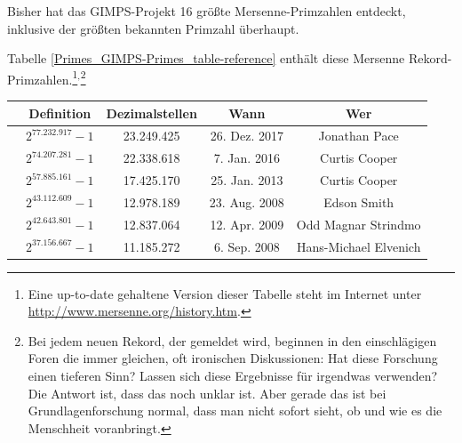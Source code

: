 \begin{refsegment}
\begin{sloppypar}
Bisher hat das GIMPS-Projekt 16  %
größte Mersenne-Primzahlen entdeckt, inklusive der größten bekannten
Primzahl überhaupt.
\end{sloppypar}

Tabelle \ref{Primes_GIMPS-Primes_table-reference} enthält diese Mersenne
Rekord-Primzahlen.\footnote{%
Eine up-to-date gehaltene Version dieser Tabelle steht im Internet unter
     \url{http://www.mersenne.org/history.htm}.%
}$^,$\footnote{%
Bei jedem neuen Rekord, der gemeldet wird, beginnen in den einschlägigen
Foren die immer gleichen, oft ironischen Diskussionen: Hat diese Forschung
einen tieferen Sinn? Lassen sich diese Ergebnisse für irgendwas verwenden?\\
Die Antwort ist, dass das noch unklar ist. Aber gerade das ist bei
Grundlagenforschung normal, dass man nicht sofort sieht, ob und wie es die
Menschheit voranbringt.
}

\ignoreoutput{\rowno[0]}
\begin{table}[ht]
\begin{center}
\begin{tabular}{|c|cccc|}
\hline \rule{0pt}{10pt}
	& \textbf{Definition} & \textbf{Dezimalstellen} & \textbf{Wann} & \textbf{Wer} \\
\hline \rule{0pt}{15pt}

	\rowno & $2^{77.232.917}-1$ & 23.249.425 & 26. Dez. 2017 & Jonathan Pace  \\
	\rowno & $2^{74.207.281}-1$ & 22.338.618 & 7. Jan. 2016 & Curtis Cooper  \\
	\rowno & $2^{57.885.161}-1$ & 17.425.170 & 25. Jan. 2013 & Curtis Cooper  \\
	\rowno & $2^{43.112.609}-1$ & 12.978.189 & 23. Aug. 2008 & Edson Smith  \\
	\rowno & $2^{42.643.801}-1$ & 12.837.064 & 12. Apr. 2009 & Odd Magnar Strindmo \\
	\rowno & $2^{37.156.667}-1$ & 11.185.272 & 6. Sep. 2008 & Hans-Michael Elvenich \\


\end{tabular}
\end{center}
\end{table}
\end{refsegment}
